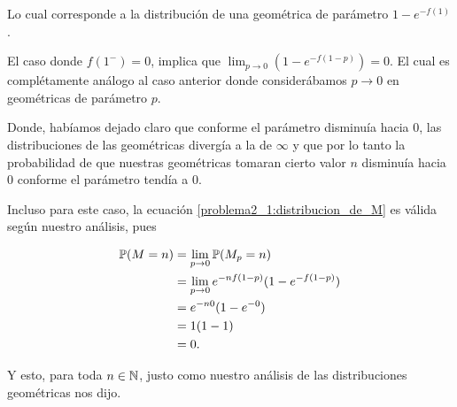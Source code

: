 Lo cual corresponde a la distribución de una geométrica de parámetro $1-e^{- f(1)}$.\par\null

El caso donde $f(1^-) = 0$, implica que $\lim_{p\rightarrow0} (1-e^{- f(1-p)}) = 0$. El cual es complétamente
análogo al caso anterior donde considerábamos $p \rightarrow 0$ en geométricas de parámetro $p$.\par\null

Donde, habíamos dejado claro que conforme el parámetro disminuía hacia 0, las distribuciones de las geométricas divergía 
a la de $\infty$ y que por lo tanto la probabilidad de que nuestras geométricas tomaran cierto 
valor $n$ disminuía hacia $0$ conforme el parámetro tendía a $0$.\par\null

Incluso para este caso, la ecuación \eqref{problema2_1:distribucion_de_M} es válida según nuestro análisis, pues

\begin{align}
\mathbb{P}(M = n)  &=  \lim_{p \rightarrow 0} \mathbb{P}(M_p = n)                         \\
                &=  \lim_{p \rightarrow 0} e^{-n f(1-p)}(1-e^{- f(1-p)})    \\
                &=  e^{-n 0}(1-e^{- 0})                                     \\
                &=  1(1-1)                                                  \\
                &=  0.
\end{align}

Y esto, para toda $n \in \mathbb{N}$, justo como nuestro análisis de las distribuciones geométricas
nos dijo.